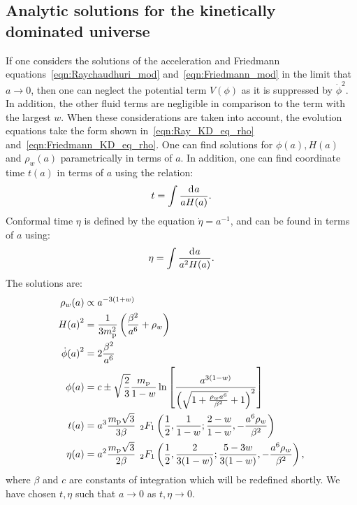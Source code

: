 \subsection{Analytic solutions for the kinetically dominated universe} 
If one considers the solutions of the acceleration and Friedmann equations~\eqref{eqn:Raychaudhuri_mod} and~\eqref{eqn:Friedmann_mod} in the limit that \(a\to0\), then one can neglect the potential term \(V(\phi)\) as it is suppressed by \(\dot{\phi}^2\). In addition, the other fluid terms are negligible in comparison to the term with the largest \(w\).  When these considerations are taken into account, the evolution equations take the form shown in~\eqref{eqn:Ray_KD_eq_rho} and~\eqref{eqn:Friedmann_KD_eq_rho}. One can find solutions for \(\phi(a),H(a)\) and \(\rho_w(a)\) parametrically in terms of \(a\).  In addition, one can find coordinate time \(t(a)\) in terms of \(a\) using the relation:
%
\begin{equation}
  t = \int \frac{\operatorname{d}^{}\!{a}}{aH(a)}.
\end{equation}
%
Conformal time \(\eta\) is defined by the equation \(\dot{\eta} =
a^{-1}\), and can be found in terms of \(a\) using:
%
\begin{equation}
  \eta = \int \frac{\operatorname{d}^{}\!{a}}{a^2H(a)}.
\end{equation}
%
The solutions are:
%
\begin{align}
  \rho_w(a) 
  &\propto 
  a^{-3(1+w)} 
  \\
  H{(a)}^2 
  &= 
  \frac{1}{3m_{\mathrm{p}}^2}\left(\frac{\beta^2}{a^6} + \rho_w\right)  
  \label{eqn:H_of_a}
  \\
  \dot{\phi}{(a)}^2
  &=
  2\frac{\beta^2}{a^6} 
  \label{eqn:dotphi_of_a}
  \\
  \phi(a)
  &=
  c  \pm
  \sqrt{\frac{2}{3}}\frac{m_{\mathrm{p}}}{1-w} \ln \left[ 
  \frac 
  {{a}^{3(1-w)}}
  {{\left(\sqrt{1+\frac{\rho_w{a}^{6}}{\beta^2}}+1\right)}^2} 
  \right]  
  \label{eqn:phi_of_a}
  \\
  t(a)
  &=
  a^3 \frac{m_{\mathrm{p}}\sqrt{3}}{3\beta} 
  \:\: 
  {_2F_1}\left(
  \frac{1}{2},
  \frac{1}{1-w};
  \frac{2-w}{1-w},
  -\frac{a^6\rho_w}{\beta^2}
  \right) 
  \label{eqn:t_of_a}
  \\
  \eta(a) 
  &= 
  a^2 \frac{m_{\mathrm{p}}\sqrt{3}}{2\beta}
  \:\: 
  {_2F_1}\left(
  \frac{1}{2},
  \frac{2}{3(1-w)};
  \frac{5-3w}{3(1-w)},
  -\frac{a^6\rho_w}{\beta^2}
  \right),
  \label{eqn:eta_of_a}
\end{align}
%
where \(\beta\) and \(c\) are constants of integration which will be redefined shortly. We have chosen \(t,\eta\) such that \(a\to0\) as \(t,\eta \to 0\).


